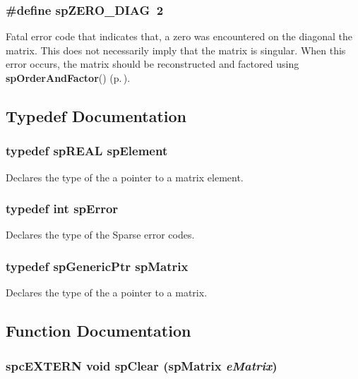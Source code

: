\subsubsection{\setlength{\rightskip}{0pt plus 5cm}\#define sp\-ZERO\_\-DIAG\ 2}\label{spMatrix_8h_a2}


Fatal error code that indicates that, a zero was encountered on the diagonal the matrix. This does not necessarily imply that the matrix is singular. When this error occurs, the matrix should be reconstructed and factored using {\bf sp\-Order\-And\-Factor}() {\rm (p.\,\pageref{spMatrix_8h_a46})}. 

\subsection{Typedef Documentation}
\subsubsection{\setlength{\rightskip}{0pt plus 5cm}typedef sp\-REAL sp\-Element}\label{spMatrix_8h_a20}


Declares the type of the a pointer to a matrix element. 
\subsubsection{\setlength{\rightskip}{0pt plus 5cm}typedef int sp\-Error}\label{spMatrix_8h_a21}


Declares the type of the Sparse error codes. 
\subsubsection{\setlength{\rightskip}{0pt plus 5cm}typedef sp\-Generic\-Ptr sp\-Matrix}\label{spMatrix_8h_a19}


Declares the type of the a pointer to a matrix. 

\subsection{Function Documentation}
\subsubsection{\setlength{\rightskip}{0pt plus 5cm}spc\-EXTERN void sp\-Clear ({\bf sp\-Matrix} {\em e\-Matrix})}\label{spMatrix_8h_a22}


